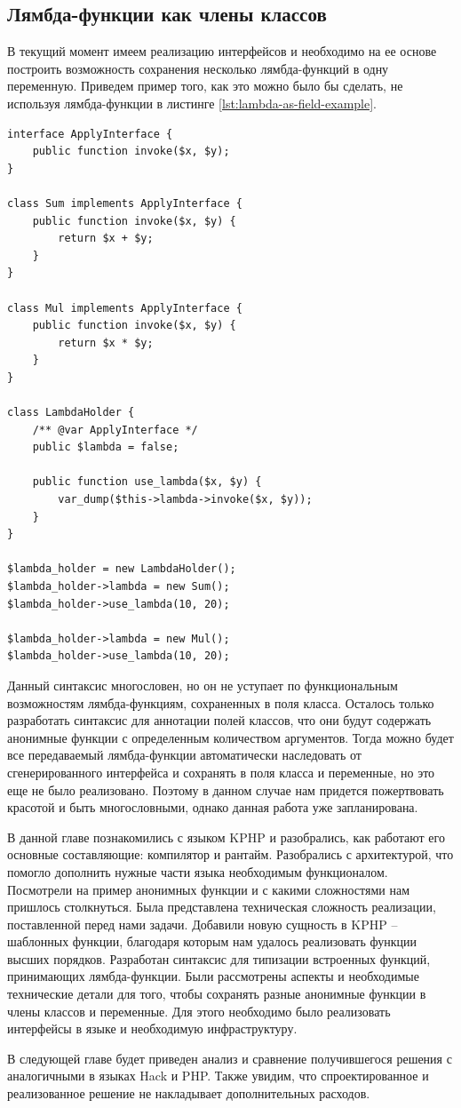 \subsection{Лямбда-функции как члены классов}
В текущий момент имеем реализацию интерфейсов и необходимо на ее основе построить возможность сохранения несколько лямбда-функций в одну переменную.
Приведем пример того, как это можно было бы сделать, не используя лямбда-функции в листинге \ref{lst:lambda-as-field-example}.
\begin{lstlisting}[caption={Пример замены сохранения лямбда-функции в поле класса},label={lst:lambda-as-field-example}]
interface ApplyInterface {
    public function invoke($x, $y);
}

class Sum implements ApplyInterface {
    public function invoke($x, $y) {
        return $x + $y;
    }
}

class Mul implements ApplyInterface {
    public function invoke($x, $y) {
        return $x * $y;
    }
}

class LambdaHolder {
    /** @var ApplyInterface */
    public $lambda = false;

    public function use_lambda($x, $y) {
        var_dump($this->lambda->invoke($x, $y));
    }
}

$lambda_holder = new LambdaHolder();
$lambda_holder->lambda = new Sum();
$lambda_holder->use_lambda(10, 20);

$lambda_holder->lambda = new Mul();
$lambda_holder->use_lambda(10, 20);
\end{lstlisting}

Данный синтаксис многословен, но он не уступает по функциональным возможностям лямбда-функциям, сохраненных в поля класса.
Осталось только разработать синтаксис для аннотации полей классов, что они будут содержать анонимные функции с определенным количеством аргументов.
Тогда можно будет все передаваемый лямбда-функции автоматически наследовать от сгенерированного интерфейса и сохранять в поля класса и переменные, но это еще не было реализовано.
Поэтому в данном случае нам придется пожертвовать красотой и быть многословными, однако данная работа уже запланирована.

\chapterconclusion
В данной главе познакомились с языком KPHP и разобрались, как работают его основные составляющие: компилятор и рантайм.
Разобрались с архитектурой, что помогло дополнить нужные части языка необходимым функционалом.
Посмотрели на пример анонимных функции и с какими сложностями нам пришлось столкнуться.
Была представлена техническая сложность реализации, поставленной перед нами задачи.
Добавили новую сущность в KPHP -- шаблонных функции, благодаря которым нам удалось реализовать функции высших порядков.
Разработан синтаксис для типизации встроенных функций, принимающих лямбда-функции.
Были рассмотрены аспекты и необходимые технические детали для того, чтобы сохранять разные анонимные функции в члены классов и переменные.
Для этого необходимо было реализовать интерфейсы в языке и необходимую инфраструктуру.

В следующей главе будет приведен анализ и сравнение получившегося решения с аналогичными в языках Hack и PHP.
Также увидим, что спроектированное и реализованное решение не накладывает дополнительных расходов.
